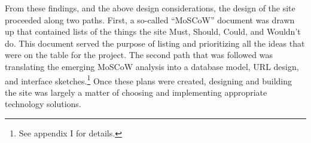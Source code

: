 From these findings, and the above design considerations, the design of the site proceeded along two paths. First, a so-called ``MoSCoW'' document was drawn up that contained lists of the things the site Must, Should, Could, and Wouldn't do.\cite{clegg_case_1994} This document served the purpose of listing and prioritizing all the ideas that were on the table for the project. The second path that was followed was translating the emerging MoSCoW analysis into a database model, URL design, and interface sketches.\footnote{See appendix I for details.} Once these plans were created, designing and building the site was largely a matter of choosing and implementing appropriate technology solutions.
